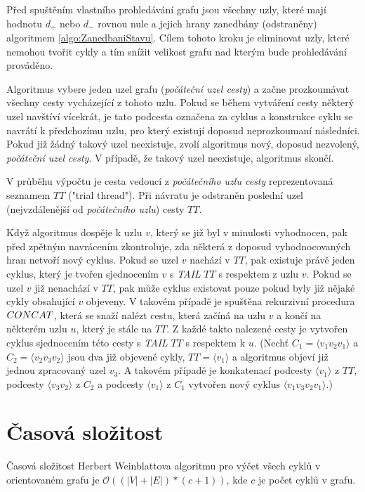         Před spuštěním vlastního prohledávání grafu jsou všechny uzly, které mají hodnotu $d_+$ nebo $d_-$ rovnou nule a jejich hrany zanedbány (odstraněny) algoritmem \ref{algo:ZanedbaniStavu}. Cílem tohoto kroku je eliminovat uzly, které nemohou tvořit cykly a tím snížit velikost grafu nad kterým bude prohledávání prováděno.

        Algoritmus vybere jeden uzel grafu (\textit{počáteční uzel cesty}) a začne prozkoumávat všechny cesty vycházející z tohoto uzlu. Pokud se během vytváření cesty některý uzel navštíví vícekrát, je tato podcesta označena za cyklus a konstrukce cyklu se navrátí k předchozímu uzlu, pro který existují doposud neprozkoumaní následníci. Pokud již žádný takový uzel neexistuje, zvolí algoritmus nový, doposud nezvolený, \textit{počáteční uzel cesty}. V případě, že takový uzel neexistuje, algoritmus skončí.

        V průběhu výpočtu je cesta vedoucí z \textit{počátečního uzlu cesty} reprezentovaná seznamem $TT$ ("trial thread"). Při návratu je odstraněn poslední uzel (nejvzdálenější od \textit{počátečního uzlu}) cesty $TT$.

        Když algoritmus dospěje k uzlu $v$, který se již byl v minulosti vyhodnocen, pak před zpětným navrácením zkontroluje, zda některá z doposud vyhodnocovaných hran netvoří nový cyklus. Pokud se uzel $v$ nachází v $TT$, pak existuje právě jeden cyklus, který je tvořen sjednocením $v$ s \textit{TAIL} $TT$ s respektem z uzlu $v$. Pokud se uzel $v$ již nenachází v $TT$, pak může cyklus existovat pouze pokud byly již nějaké cykly obsahující $v$ objeveny. V takovém případě je spuštěna rekurzivní procedura $\mathnormal{CONCAT}$, která se snaží nalézt cestu, která začíná na uzlu $v$ a končí na některém uzlu $u$, který je stále na $TT$. Z každé takto nalezené cesty je vytvořen cyklus sjednocením této cesty s \textit{TAIL} $TT$ s respektem k $u$. (Nechť $C_1 = \langle v_1v_2v_1 \rangle$ a $C_2 = \langle v_2v_3v_2 \rangle$ jsou dva již objevené cykly, $TT = \langle v_1 \rangle$ a algoritmus objeví již jednou zpracovaný uzel $v_3$. A takovém případě je konkatenací podcesty $\langle v_1 \rangle$ z $TT$, podcesty $\langle v_3v_2 \rangle$ z $C_2$ a podcesty $\langle v_1 \rangle$ z $C_1$ vytvořen nový cyklus $\langle v_1v_3v_2v_1 \rangle$.)

    \section{Časová složitost}
        \begin{theorem}
            Časová složitost Herbert Weinblattova algoritmu pro výčet všech cyklů v orientovaném grafu je $\mathcal{O}((|V| + |E|)*(c + 1))$, kde $c$ je počet cyklů v grafu.
        \end{theorem}

